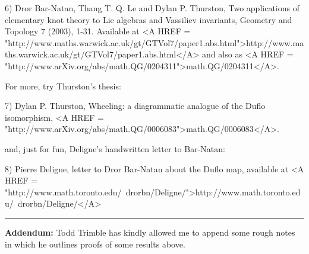 6) Dror Bar-Natan, Thang T. Q. Le and Dylan P. Thurston, Two
applications of elementary knot theory to Lie algebras and Vassiliev
invariants, Geometry and Topology 7 (2003), 1-31.  Available at
<A HREF = "http://www.maths.warwick.ac.uk/gt/GTVol7/paper1.abs.html">http://www.maths.warwick.ac.uk/gt/GTVol7/paper1.abs.html</A> 
and also
as <A HREF = "http://www.arXiv.org/abs/math.QG/0204311">math.QG/0204311</A>.

For more, try Thurston's thesis:

7) Dylan P. Thurston, Wheeling: a diagrammatic analogue of the Duflo
isomorphism, <A HREF = "http://www.arXiv.org/abs/math.QG/0006083">math.QG/0006083</A>.

and, just for fun, Deligne's handwritten letter to Bar-Natan:

8) Pierre Deligne, letter to Dror Bar-Natan about the Duflo map,
available at <A HREF = "http://www.math.toronto.edu/~drorbn/Deligne/">http://www.math.toronto.edu/~drorbn/Deligne/</A>

\par\noindent\rule{\textwidth}{0.4pt}
\textbf{Addendum:} Todd Trimble has kindly allowed me to append
some rough notes in which he outlines proofs of some results
above.


